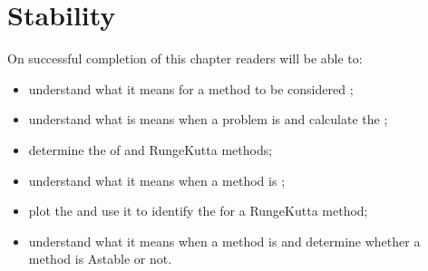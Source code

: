 \documentclass[letterpaper,10pt,english]{jupyterBook}
\begin{document}
\sphinxstepscope


\chapter{Stability}
\label{\detokenize{4_Stability/4.0_Stability:stability}}\label{\detokenize{4_Stability/4.0_Stability:stability-chapter}}\label{\detokenize{4_Stability/4.0_Stability::doc}}
\sphinxAtStartPar
{}

\sphinxAtStartPar
On successful completion of this chapter readers will be able to:
\begin{itemize}
\item {} 
\sphinxAtStartPar
understand what it means for a method to be considered {\hyperref[\detokenize{4_Stability/4.0_Stability:stability-definition}]{}};

\item {} 
\sphinxAtStartPar
understand what is means when a problem is {\hyperref[\detokenize{4_Stability/4.0_Stability:stiffness-section}]{}} and calculate the {\hyperref[\detokenize{4_Stability/4.0_Stability:stiffness-ratio-definition}]{}};

\item {} 
\sphinxAtStartPar
determine the {\hyperref[\detokenize{4_Stability/4.1_Stability_functions:stability-function-definition}]{}} of {\hyperref[\detokenize{4_Stability/4.2_RK_stability_function:erk-rz-definition}]{}} and {\hyperref[\detokenize{4_Stability/4.3_IRK_stability_function:irk-rz-definition}]{}} Runge\sphinxhyphen{}Kutta methods;

\item {} 
\sphinxAtStartPar
understand what it means when a method is {\hyperref[\detokenize{4_Stability/4.1_Stability_functions:absolute-stability-definition}]{}};

\item {} 
\sphinxAtStartPar
plot the {\hyperref[\detokenize{4_Stability/4.1_Stability_functions:plot-stability-region-section}]{}} and use it to identify the {\hyperref[\detokenize{4_Stability/4.1_Stability_functions:plot-stability-region-section}]{}} for a Runge\sphinxhyphen{}Kutta method;

\item {} 
\sphinxAtStartPar
understand what it means when a method is {\hyperref[\detokenize{4_Stability/4.3_IRK_stability_function:a-stability-definition}]{}} and determine whether a method is A\sphinxhyphen{}stable or not.

\end{itemize}
\end{document}
